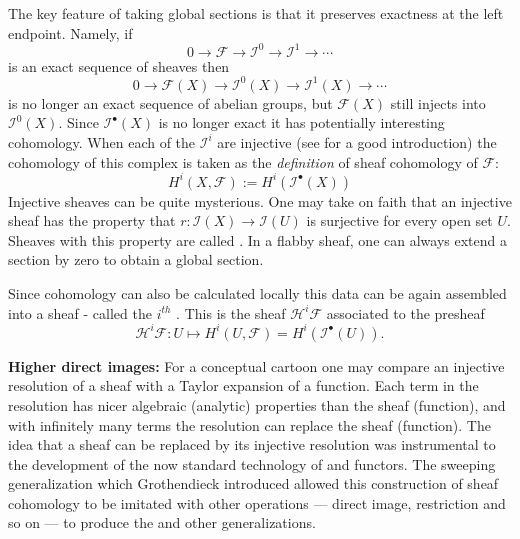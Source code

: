 \documentclass{psapm-l}
\theoremstyle{definition}
\theoremstyle{remark}
\numberwithin{equation}{section}
\begin{document}
The key feature of taking global sections is that it preserves exactness at the left endpoint. Namely, if
\[
    0
    \stackrel{}{\longrightarrow}{{\mathcal F}}
    \stackrel{}{\longrightarrow}\mathcal{I}^0
    \stackrel{}{\longrightarrow}\mathcal{I}^1
    \stackrel{}{\longrightarrow}\cdots
\]
is an exact sequence of sheaves then
\[
    0
    \stackrel{}{\longrightarrow}{{\mathcal F}}(X)
    \stackrel{}{\longrightarrow}\mathcal{I}^0(X)
    \stackrel{}{\longrightarrow}\mathcal{I}^1(X)
    \stackrel{}{\longrightarrow}\cdots
\]
is no longer an exact sequence of abelian groups, but ${{\mathcal F}}(X)$ still injects into $\mathcal{I}^0(X)$. Since $\mathcal{I}^{\bullet}(X)$ is no longer exact it has potentially interesting cohomology. When each of the $\mathcal{I}^i$ are injective (see \cite{Iversen} for a good introduction) the cohomology of this complex is taken as the {\em definition} of sheaf cohomology of ${{\mathcal F}}$:
\[
	H^i(X,{{\mathcal F}}) := H^i(\mathcal{I}^{\bullet}(X))
\]
Injective sheaves can be quite mysterious. One may take on faith that an injective sheaf has the property that $r\colon\mathcal{I}(X)\to\mathcal{I}(U)$ is surjective for every open set $U$. Sheaves with this property are called {{}}. In a flabby sheaf, one can always extend a section by zero to obtain a global section.

Since cohomology can also be calculated locally this data can be again assembled into a sheaf - called the $i^{th}$ {{}}. This is the sheaf $\mathcal{H}^i{{\mathcal F}}$ associated to the presheaf
\[
	\mathcal{H}^i{{\mathcal F}}: U \mapsto H^i(U,{{\mathcal F}})=H^i(\mathcal{I}^{\bullet}(U)).
\]

\vspace{0.1in}
\noindent
{\bf Higher direct images:}
For a conceptual cartoon one may compare an injective resolution of a sheaf with a Taylor expansion of a function. Each term in the resolution has nicer algebraic (analytic) properties than the sheaf (function), and with infinitely many terms the resolution can replace the
sheaf (function). The idea that a sheaf can be replaced by its injective resolution was instrumental to the development of the now standard technology of {{}} and functors. The sweeping generalization which Grothendieck introduced \cite{tohoku} allowed this construction of sheaf cohomology to be imitated with other operations --- direct image, restriction and so on --- to produce the {{}} and other generalizations.
\end{document}
